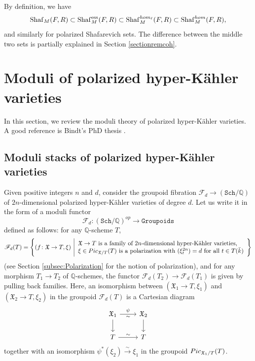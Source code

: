 \documentclass[11pt,reqno,oneside]{amsart}
\numberwithin{equation}{section}
\theoremstyle{definition}
\DeclareMathOperator{\ess}{ess}
\newcommand{\Pic}{{\rm Pic}}
\renewcommand{\hom}{{\rm hom}}
\newcommand{\Sha}{\mathrm{Shaf}}
\newcommand{\scF}{\mathscr{F}}
\newcommand{\QQ}{\mathbb{Q}}
\newcommand{\fX}{\mathfrak{X}}
\begin{document}
By definition, we have 
\begin{equation}
            \Sha_{M}(F,R) \subset \Sha_{M}^{\ess}(F,R)\subset \Sha_{M}^{\hom_\ell}(F,R)\subset \Sha_{M}^{\hom}(F,R),
\end{equation}
and similarly for polarized Shafarevich sets. 
The difference between the middle two sets is partially explained in Section \ref{sectionremcoh}.





\section{Moduli of polarized hyper-Kähler varieties}
\label{sec:ModuliHK}
In this section, we review the moduli theory of polarized hyper-Kähler varieties. A good reference is Bindt's PhD thesis \cite{BindtThesis}.
\subsection{Moduli stacks of polarized hyper-Kähler varieties}
Given positive integers $n$ and $d$, consider the groupoid fibration $\scF_d\to (\mathtt{Sch}/\QQ)$ of $2n$-dimensional polarized hyper-Kähler varieties of degree $d$. Let us write it in the form of a moduli functor $$\scF_{d} \colon (\mathtt{Sch}/\QQ)^{op}\to \mathtt{Groupoids}$$  defined as follows: for any $\QQ$-scheme $T$,
\begin{equation}
	\scF_d(T)= \left\{ (f \colon\fX \rightarrow T, \xi)~\Bigg| \begin{array}{lr}
		\hbox{\rm $\fX \rightarrow T$ is a family of $2n$-dimensional hyper-Kähler varieties,}\\
		\hbox{\rm   $\xi\in \Pic_{\fX/T}(T)$ is a polarization with $(\xi_t^{2n})=d$ for all $t\in T(\bar{k})$}   	\end{array}
	\right\}
\end{equation}
(see Section \ref{subsec:Polarization} for the notion of polarization), and for any morphism $T_1\to T_2$ of $\QQ$-schemes, the functor $\scF_d(T_2)\to \scF_d(T_1)$ is given by  pulling back families.
Here, an isomorphism between $(\fX_1 \to T, \xi_1)$ and $(\fX_2 \to T, \xi_2)$ in the groupoid $\scF_d(T)$ is a Cartesian diagram
\[
\begin{tikzcd}
 \fX_1 \ar[r,"\psi","\sim"'] \ar[d,""] & \fX_2 \ar[d, ""] \\
 T \ar[r, "\sim"] & T
\end{tikzcd}
\]
together with an isomorphism $\psi^*(\xi_2) \xrightarrow{\sim} \xi_1$ in the groupoid $\Pic_{\fX_1/T}(T)$.
\end{document}
